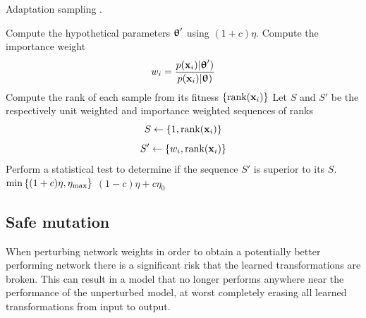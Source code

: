 \begin{algorithm}[tbp!]
    \caption{Adaptation sampling \cite{Schaul2012}. \label{alg: Adaptation sampling}}
    \begin{algorithmic}[1]
        \State Compute the hypothetical parameters ${\boldsymbol{\uptheta}}'$ using $(1+c)\eta$.
            \State Compute the importance weight 
            $$w_i=\frac{p({\mathbf{x}}_i)|{\boldsymbol{\uptheta}}')}{p({\mathbf{x}}_i)|{\boldsymbol{\uptheta}})}$$
        \EndFor
        \State Compute the rank of each sample from its fitness $\{\text{rank}({\mathbf{x}}_i)\}$
        \State Let $S$ and $S'$ be the respectively unit weighted and importance weighted sequences of ranks
        $$S\gets\{1,\text{rank}({\mathbf{x}}_i)\}$$
        $$S'\gets\{w_i,\text{rank}({\mathbf{x}}_i)\}$$
        \State Perform a statistical test to determine if the sequence $S'$ is superior to its $S$.
         \Return $\min{\left\{(1+c)\eta, \eta_{\text{max}}\right\}}$  
        \Else{} \Return $(1-c)\eta + c\eta_0$  
        \EndIf
    \end{algorithmic}
\end{algorithm}





\subsection{Safe mutation}
When perturbing network weights in order to obtain a potentially better performing network there is a significant risk that the learned transformations are broken. This can result in a model that no longer performs anywhere near the performance of the unperturbed model, at worst completely erasing all learned transformations from input to output.

